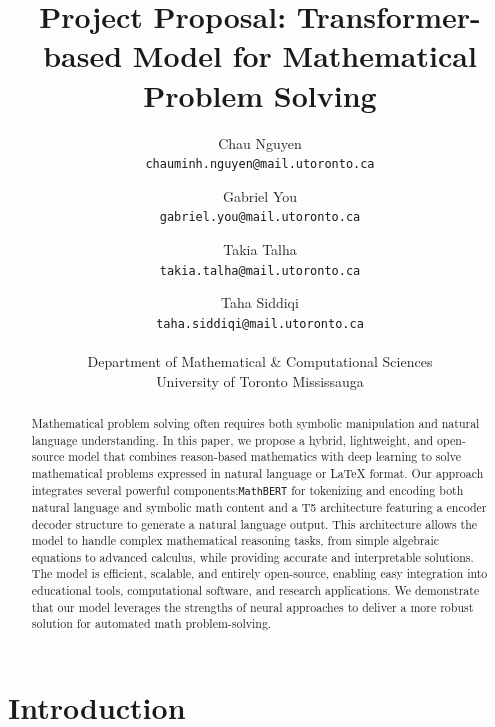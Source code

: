\documentclass{article}
\title{Project Proposal: Transformer-based Model for Mathematical Problem Solving}
\author{%
    Chau Nguyen \\
    \texttt{chauminh.nguyen@mail.utoronto.ca} \\
    \and
    Gabriel You \\
    \texttt{gabriel.you@mail.utoronto.ca} \\
    \and
    Takia Talha \\
    \texttt{takia.talha@mail.utoronto.ca} \\
    \and
    Taha Siddiqi \\
    \texttt{taha.siddiqi@mail.utoronto.ca} \\
    \\
    Department of Mathematical \& Computational Sciences \\
    University of Toronto Mississauga
}
\begin{document}
\maketitle


\begin{abstract}


  Mathematical problem solving often requires both symbolic manipulation and natural language understanding. In this paper, we propose a hybrid, lightweight, and open-source model that combines reason-based mathematics with deep learning to solve mathematical problems expressed in natural language or LaTeX format. Our approach integrates several powerful components:\texttt{MathBERT} for tokenizing and encoding both natural language and symbolic math content and a T5 architecture featuring a encoder decoder structure to generate a natural language output. This architecture allows the model to handle complex mathematical reasoning tasks, from simple algebraic equations to advanced calculus, while providing accurate and interpretable solutions. The model is efficient, scalable, and entirely open-source, enabling easy integration into educational tools, computational software, and research applications. We demonstrate that our  model leverages the strengths of neural approaches to deliver a more robust solution for automated math problem-solving.
  \end{abstract}
\section{Introduction}

\end{document}
